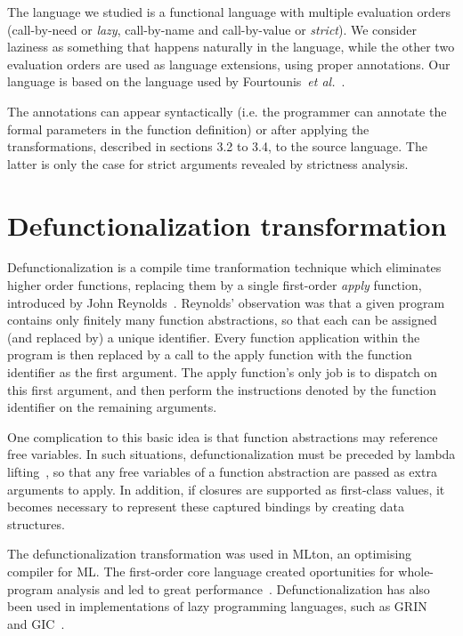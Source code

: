\documentclass[diploma]{softlab-thesis}
\begin{document}
The language we studied is a functional language with multiple
evaluation orders (call-by-need or \textit{lazy}, call-by-name and
call-by-value or \textit{strict}).  We consider laziness as something
that happens naturally in the language, while the other two evaluation
orders are used as language extensions, using proper annotations. Our
language is based on the language used by
Fourtounis~\emph{et al.}~\cite{Fourtounis:2013:GIT:2769663.2769674,Fourtounis14}.

The annotations can appear syntactically (i.e. the programmer can annotate 
the formal parameters in the function definition) or 
after applying the transformations, described in sections 3.2 to 3.4, 
to the source language. The latter
is only the case for strict arguments revealed by strictness analysis.

\section {Defunctionalization transformation}
\label{sec:defunctionalization}

Defunctionalization is a compile time tranformation technique which eliminates higher order 
functions, replacing them by a single first-order \textit{apply} function, introduced by John Reynolds~\cite{Reynolds72definitionalinterpreters}.
Reynolds' observation was that a given program contains only finitely many function abstractions, so that each can 
be assigned (and replaced by) a unique identifier. Every function application within the program is then replaced 
by a call to the apply function with the function identifier as the first argument. The apply function's only job is 
to dispatch on this first argument, and then perform the instructions denoted by the function identifier on the 
remaining arguments.

One complication to this basic idea is that function abstractions may reference free variables. In such situations, 
defunctionalization must be preceded by lambda lifting~\cite{Johnsson:1985:LLT:5280.5292}, so that any free variables of a function 
abstraction are passed as extra arguments to apply. In addition, if closures are supported as first-class values, 
it becomes necessary to represent these captured bindings by creating data structures.

The defunctionalization transformation was used in MLton, an optimising compiler for ML. The first-order
core language created oportunities for whole-program analysis and led to great performance~\cite{mlton}. Defunctionalization has also been used in implementations of lazy programming languages, such as GRIN~\cite{Boquist96,Podlovics19} and GIC~\cite{Fourtounis14,Fourtounis14a}.
\end{document}
